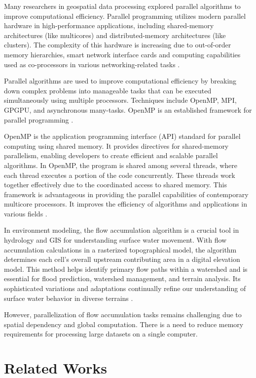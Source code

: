 \documentclass[journal, a4paper]{IEEEtran}
\begin{document}
	Many researchers in geospatial data processing explored parallel algorithms to improve computational efficiency. Parallel programming utilizes modern parallel hardware in high-performance applications, including shared-memory architectures (like multicores) and distributed-memory architectures (like clusters). The complexity of this hardware is increasing due to out-of-order memory hierarchies, smart network interface cards and computing capabilities used as co-processors in various networking-related tasks \cite{LOFF2021743}.
	
	Parallel algorithms are used to improve computational efficiency by breaking down complex problems into manageable tasks that can be executed simultaneously using multiple processors. Techniques include OpenMP, MPI, GPGPU, and asynchronous many-tasks. OpenMP is an established framework for parallel programming \cite{KOTYRA2023105728}.
	
	OpenMP is the application programming interface (API) standard for parallel computing using shared memory. It provides directives for shared-memory parallelism, enabling developers to create efficient and scalable parallel algorithms. In OpenMP, the program is shared among several threads, where each thread executes a portion of the code concurrently. These threads work together effectively due to the coordinated access to shared memory. This framework is advantageous in providing the parallel capabilities of contemporary multicore processors. It improves the efficiency of algorithms and applications in various fields \cite{chapman2007using}.
	
	In environment modeling, the flow accumulation algorithm is a crucial tool in hydrology and GIS for understanding surface water movement. With flow accumulation calculations in a rasterized topographical model, the algorithm determines each cell's overall upstream contributing area in a digital elevation model. This method helps identify primary flow paths within a watershed and is essential for flood prediction, watershed management, and terrain analysis. Its sophisticated variations and adaptations continually refine our understanding of surface water behavior in diverse terrains \cite{CHO2023105771,KOTYRA2023105728,Zhou2019}.
	
	However, parallelization of flow accumulation tasks remains challenging due to spatial dependency and global computation. There is a need to reduce memory requirements for processing large datasets on a single computer.
	
	
	\section{Related Works} 
	\label{sec: ls}
	
\end{document}
